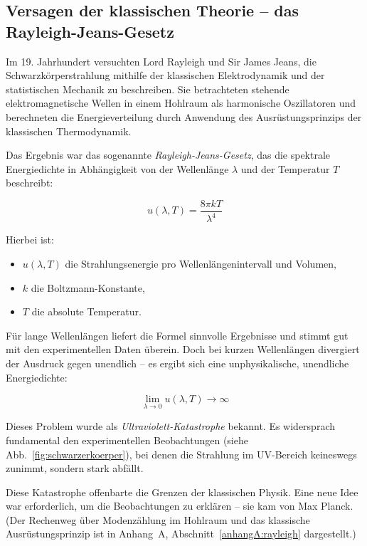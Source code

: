 \subsection{Versagen der klassischen Theorie – \newline das Rayleigh-Jeans-Gesetz}

Im 19. Jahrhundert versuchten Lord Rayleigh und Sir James Jeans, die Schwarzkörperstrahlung mithilfe der klassischen Elektrodynamik und der statistischen Mechanik zu beschreiben. Sie betrachteten stehende elektromagnetische Wellen in einem Hohlraum als harmonische Oszillatoren und berechneten die Energieverteilung durch Anwendung des Ausrüstungsprinzips der klassischen Thermodynamik.

Das Ergebnis war das sogenannte \emph{Rayleigh-Jeans-Gesetz}, das die spektrale Energiedichte in Abhängigkeit von der Wellenlänge \( \lambda \) und der Temperatur \( T \) beschreibt:

\[
u(\lambda, T) = \frac{8 \pi k T}{\lambda^4}
\]

Hierbei ist:
\begin{itemize}
	\item \( u(\lambda, T) \) die Strahlungsenergie pro Wellenlängenintervall und Volumen,
	\item \( k \) die Boltzmann-Konstante,
	\item \( T \) die absolute Temperatur.
\end{itemize}

Für lange Wellenlängen liefert die Formel sinnvolle Ergebnisse und stimmt gut mit den experimentellen Daten überein. Doch bei kurzen Wellenlängen divergiert der Ausdruck gegen unendlich – es ergibt sich eine unphysikalische, unendliche Energiedichte:

\[
\lim_{\lambda \to 0} u(\lambda, T) \to \infty
\]

Dieses Problem wurde als \emph{Ultraviolett-Katastrophe} bekannt. Es widersprach fundamental den experimentellen Beobachtungen (siehe Abb.~\ref{fig:schwarzerkoerper}), bei denen die Strahlung im UV-Bereich keineswegs zunimmt, sondern stark abfällt.

Diese Katastrophe offenbarte die Grenzen der klassischen Physik. Eine neue Idee war erforderlich, um die Beobachtungen zu erklären – sie kam von Max Planck.
(Der Rechenweg über Modenzählung im Hohlraum und das klassische Ausrüstungsprinzip ist in Anhang~A, Abschnitt~\ref{anhangA:rayleigh} dargestellt.)
